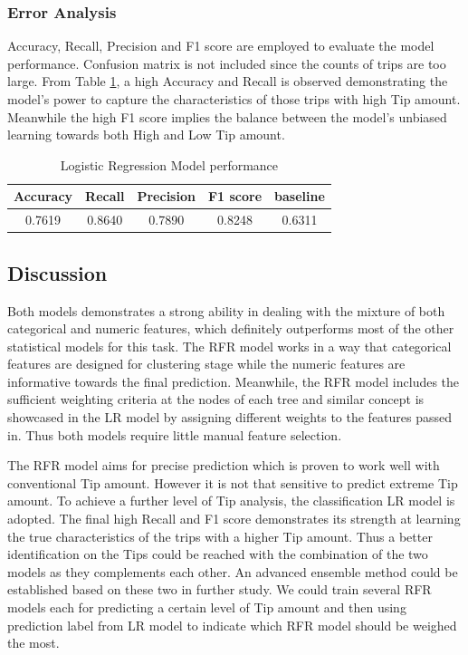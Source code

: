 \documentclass[11pt]{article}
\begin{document}
\subsubsection{Error Analysis}
Accuracy, Recall, Precision and F1 score are employed to evaluate the model performance. Confusion matrix is not included since the counts of trips are too large. From Table \ref{table:5}, a high Accuracy and Recall is observed demonstrating the model's power to capture the characteristics of those trips with high Tip amount. Meanwhile the high F1 score implies the balance between the model's unbiased learning towards both High and Low Tip amount.
\begin{table}[h!]
\centering
    \begin{tabular}{||c  c  c  c | c ||}
    \hline
    Accuracy & Recall & Precision & F1 score & baseline\\
    \hline\hline
    0.7619 & 0.8640 & 0.7890 & 0.8248 & 0.6311\\
    \hline
    \end{tabular}
\caption{Logistic Regression Model performance}
\label{table:5}
\end{table}


\subsection{Discussion}
Both models demonstrates a strong ability in dealing with the mixture of both categorical and numeric features, which definitely outperforms most of the other statistical models for this task. The RFR model works in a way that categorical features are designed for clustering stage while the numeric features are informative towards the final prediction. Meanwhile, the RFR model includes the sufficient weighting criteria at the nodes of each tree and similar concept is showcased in the LR model by assigning different weights to the features passed in. Thus both models require little manual feature selection. 

The RFR model aims for precise prediction which is proven to work well with conventional Tip amount. However it is not that sensitive to predict extreme Tip amount. To achieve a further level of Tip analysis, the classification LR model is adopted. The final high Recall and F1 score demonstrates its strength at learning the true characteristics of the trips with a higher Tip amount. Thus a better identification on the Tips could be reached with the combination of the two models as they complements each other. An advanced ensemble method could be established based on these two in further study. We could train several RFR models each for predicting a certain level of Tip amount and then using prediction label from LR model to indicate which RFR model should be weighed the most.
\end{document}
